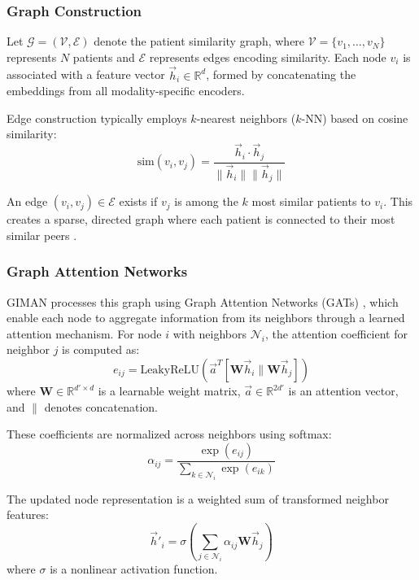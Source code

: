 \documentclass[conference]{IEEEtran}
\begin{document}
\subsubsection{Graph Construction}
Let $\mathcal{G} = (\mathcal{V}, \mathcal{E})$ denote the patient similarity graph, where $\mathcal{V} = \{v_1, \ldots, v_N\}$ represents $N$ patients and $\mathcal{E}$ represents edges encoding similarity. Each node $v_i$ is associated with a feature vector $\vec{h}_i \in \mathbb{R}^d$, formed by concatenating the embeddings from all modality-specific encoders.

Edge construction typically employs $k$-nearest neighbors ($k$-NN) based on cosine similarity:
\begin{equation}
\text{sim}(v_i, v_j) = \frac{\vec{h}_i \cdot \vec{h}_j}{\|\vec{h}_i\| \|\vec{h}_j\|}
\end{equation}

An edge $(v_i, v_j) \in \mathcal{E}$ exists if $v_j$ is among the $k$ most similar patients to $v_i$. This creates a sparse, directed graph where each patient is connected to their most similar peers \cite{wang2019patient}.

\subsubsection{Graph Attention Networks}
GIMAN processes this graph using Graph Attention Networks (GATs) \cite{velickovic2018graph}, which enable each node to aggregate information from its neighbors through a learned attention mechanism. For node $i$ with neighbors $\mathcal{N}_i$, the attention coefficient for neighbor $j$ is computed as:
\begin{equation}
e_{ij} = \text{LeakyReLU}\left(\vec{a}^T [\mathbf{W}\vec{h}_i \| \mathbf{W}\vec{h}_j]\right)
\end{equation}
where $\mathbf{W} \in \mathbb{R}^{d' \times d}$ is a learnable weight matrix, $\vec{a} \in \mathbb{R}^{2d'}$ is an attention vector, and $\|$ denotes concatenation.

These coefficients are normalized across neighbors using softmax:
\begin{equation}
\alpha_{ij} = \frac{\exp(e_{ij})}{\sum_{k \in \mathcal{N}_i} \exp(e_{ik})}
\end{equation}

The updated node representation is a weighted sum of transformed neighbor features:
\begin{equation}
\vec{h}'_i = \sigma\left(\sum_{j \in \mathcal{N}_i} \alpha_{ij} \mathbf{W}\vec{h}_j\right)
\end{equation}
where $\sigma$ is a nonlinear activation function.
\end{document}
